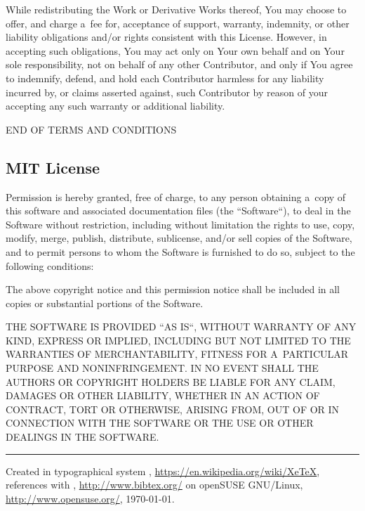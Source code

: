 \documentclass[a4paper, 11pt, twoside]{article}
\begin{document}
While redistributing the Work or Derivative Works thereof, You may choose to offer, and charge a~fee for, acceptance of support, warranty, indemnity, or other liability obligations and/or rights consistent with this License. However, in accepting such obligations, You may act only on Your own behalf and on Your sole responsibility, not on behalf of any other Contributor, and only if You agree to indemnify, defend, and hold each Contributor harmless for any liability incurred by, or claims asserted against, such Contributor by reason of your accepting any such warranty or additional liability.

END OF TERMS AND CONDITIONS

\subsection{MIT License}

Permission is hereby granted, free of charge, to any person obtaining a~copy of this software and associated documentation files (the “Software“), to deal in the Software without restriction, including without limitation the rights to use, copy, modify, merge, publish, distribute, sublicense, and/or sell copies of the Software, and to permit persons to whom the Software is furnished to do so, subject to the following conditions:

The above copyright notice and this permission notice shall be included in all copies or substantial portions of the Software.

THE SOFTWARE IS PROVIDED “AS IS“, WITHOUT WARRANTY OF ANY KIND, EXPRESS OR IMPLIED, INCLUDING BUT NOT LIMITED TO THE WARRANTIES OF MERCHANTABILITY, FITNESS FOR A~PARTICULAR PURPOSE AND NONINFRINGEMENT. IN NO EVENT SHALL THE AUTHORS OR COPYRIGHT HOLDERS BE LIABLE FOR ANY CLAIM, DAMAGES OR OTHER LIABILITY, WHETHER IN AN ACTION OF CONTRACT, TORT OR OTHERWISE, ARISING FROM, OUT OF OR IN CONNECTION WITH THE SOFTWARE OR THE USE OR OTHER DEALINGS IN THE SOFTWARE.

\endgroup



\vfill
\hrule
\vfill
\begin{tiny}
  Created in typographical system \XeLaTeX, \url{https://en.wikipedia.org/wiki/XeTeX}, references with \BibTeX, \url{http://www.bibtex.org/} on openSUSE GNU/Linux, \url{http://www.opensuse.org/}, \today.
\end{tiny}
\end{document}
